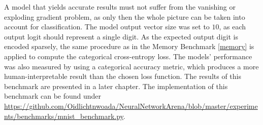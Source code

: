 \documentclass[draft,final]{vutinfth} %
\begin{document}
A model that yields accurate results must not suffer from the vanishing or exploding gradient problem, as only then the whole picture can be taken into account for classification.
The model output vector size was set to $10$, as each output logit should represent a single digit.
As the expected output digit is encoded sparsely, the same procedure as in the Memory Benchmark \ref{memory} is applied to compute the categorical cross-entropy loss.
The models' performance was also measured by using a categorical accuracy metric, which produces a more human-interpretable result than the chosen loss function.
The results of this benchmark are presented in a later chapter.
The implementation of this benchmark can be found under \url{https://github.com/Oidlichtnwoada/NeuralNetworkArena/blob/master/experiments/benchmarks/mnist_benchmark.py}.
\end{document}
